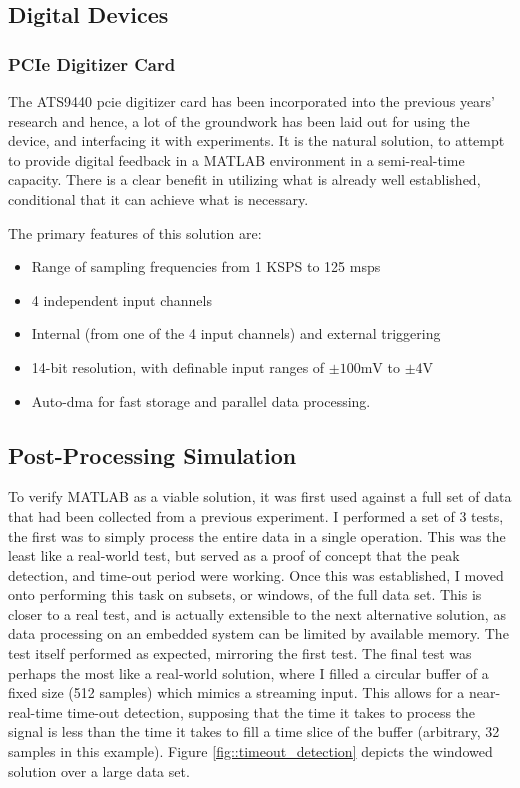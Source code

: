 
\subsection{Digital Devices}
\subsubsection{PCIe Digitizer Card}
The ATS9440 \gls{pcie} digitizer card \cite{ATS9440} has been incorporated into the previous years' research and hence, a lot of the groundwork has been laid out for using the device, and interfacing it with experiments. It is the natural solution, to attempt to provide digital feedback in a MATLAB environment in a semi-real-time capacity. There is a clear benefit in utilizing what is already well established, conditional that it can achieve what is necessary.

The primary features of this solution are:
\begin{itemize}
	\item Range of sampling frequencies from 1 KSPS to 125 \gls{msps}
	\item 4 independent input channels
	\item Internal (from one of the 4 input channels) and external triggering
	\item 14-bit resolution, with definable input ranges of $\pm 100 \textrm{mV}$ to $\pm 4 \textrm{V}$
	\item Auto-\gls{dma} for fast storage and parallel data processing.
\end{itemize}
\subsection{Post-Processing Simulation}
	To verify MATLAB as a viable solution, it was first used against a full set of data that had been collected from a previous experiment. I performed a set of 3 tests, the first was to simply process the entire data in a single operation. This was the least like a real-world test, but served as a proof of concept that the peak detection, and time-out period were working. Once this was established, I moved onto performing this task on subsets, or windows, of the full data set. This is closer to a real test, and is actually extensible to the next alternative solution, as data processing on an embedded system can be limited by available memory. The test itself performed as expected, mirroring the first test. The final test was perhaps the most like a real-world solution, where I filled a circular buffer of a fixed size (512 samples) which mimics a streaming input. This allows for a near-real-time time-out detection, supposing that the time it takes to process the signal is less than the time it takes to fill a time slice of the buffer (arbitrary, 32 samples in this example). Figure \ref{fig::timeout_detection} depicts the windowed solution over a large data set.
	
